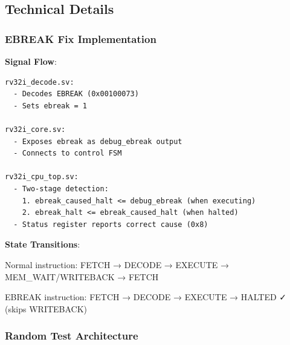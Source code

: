 \subsection{Technical Details}\label{cr:app:archive-session-summary:technical-details}

\subsubsection{EBREAK Fix Implementation}\label{cr:app:archive-session-summary:ebreak-fix-implementation}

\begin{record}

\textbf{Signal Flow}:

\begin{lstlisting}[language={}]
rv32i_decode.sv:
  - Decodes EBREAK (0x00100073)
  - Sets ebreak = 1

rv32i_core.sv:
  - Exposes ebreak as debug_ebreak output
  - Connects to control FSM

rv32i_cpu_top.sv:
  - Two-stage detection:
    1. ebreak_caused_halt <= debug_ebreak (when executing)
    2. ebreak_halt <= ebreak_caused_halt (when halted)
  - Status register reports correct cause (0x8)
\end{lstlisting}

\textbf{State Transitions}:

\begin{textblock}
Normal instruction:
  FETCH → DECODE → EXECUTE → MEM_WAIT/WRITEBACK → FETCH

EBREAK instruction:
  FETCH → DECODE → EXECUTE → HALTED ✓
                           (skips WRITEBACK)
\end{textblock}

\end{record}

\subsubsection{Random Test Architecture}\label{cr:app:archive-session-summary:random-test-architecture}

